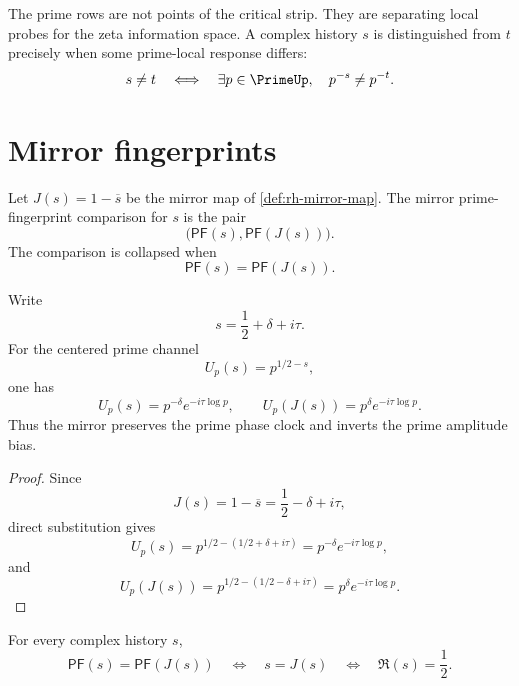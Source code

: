 \begin{principle}
\label{prin:rh-primes-are-point-probes}
The prime rows are not points of the critical strip.  They are separating
local probes for the zeta information space.  A complex history $s$ is
distinguished from $t$ precisely when some prime-local response differs:
$$
s\neq t
\quad\Longleftrightarrow\quad
\exists p\in\PrimeUp,\quad p^{-s}\neq p^{-t}.
$$
\end{principle}

\section{Mirror fingerprints}
\label{sec:rh-mirror-fingerprints}

\begin{definition}
\label{def:rh-mirror-prime-fingerprint}
Let $J(s)=1-\overline{s}$ be the mirror map of
\autoref{def:rh-mirror-map}.  The mirror prime-fingerprint comparison for
$s$ is the pair
$$
\bigl(\mathsf{PF}(s),\mathsf{PF}(J(s))\bigr).
$$
The comparison is collapsed when
$$
\mathsf{PF}(s)=\mathsf{PF}(J(s)).
$$
\end{definition}

\begin{proposition}
\label{prop:rh-mirror-prime-amplitude-bias}
Write
$$
s=\frac{1}{2}+\delta+i\tau.
$$
For the centered prime channel
$$
U_p(s)=p^{1/2-s},
$$
one has
$$
U_p(s)=p^{-\delta}e^{-i\tau\log p},
\qquad
U_p(J(s))=p^\delta e^{-i\tau\log p}.
$$
Thus the mirror preserves the prime phase clock and inverts the prime
amplitude bias.
\end{proposition}

\begin{proof}
Since
$$
J(s)=1-\overline{s}=\frac{1}{2}-\delta+i\tau,
$$
direct substitution gives
$$
U_p(s)=p^{1/2-(1/2+\delta+i\tau)}
=p^{-\delta}e^{-i\tau\log p},
$$
and
$$
U_p(J(s))=p^{1/2-(1/2-\delta+i\tau)}
=p^\delta e^{-i\tau\log p}.
$$
\end{proof}

\begin{corollary}
\label{cor:rh-prime-fingerprint-mirror-collapse}
For every complex history $s$,
$$
\mathsf{PF}(s)=\mathsf{PF}(J(s))
\quad\Longleftrightarrow\quad
s=J(s)
\quad\Longleftrightarrow\quad
\Re(s)=\frac{1}{2}.
$$
\end{corollary}

